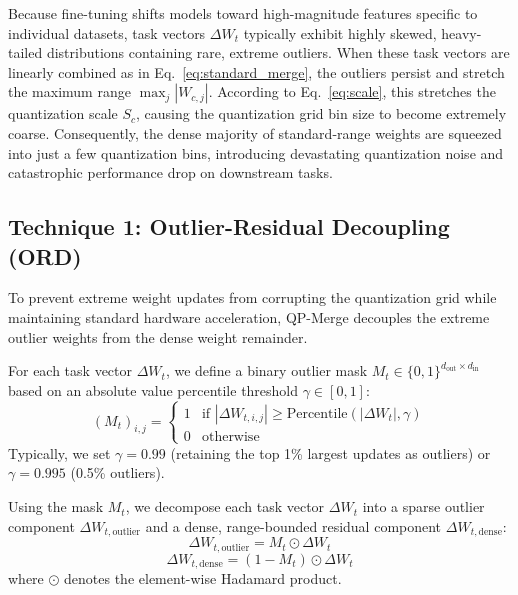 Because fine-tuning shifts models toward high-magnitude features specific to individual datasets, task vectors $\Delta W_t$ typically exhibit highly skewed, heavy-tailed distributions containing rare, extreme outliers. When these task vectors are linearly combined as in Eq.~\ref{eq:standard_merge}, the outliers persist and stretch the maximum range $\max_j |W_{c,j}|$. According to Eq.~\ref{eq:scale}, this stretches the quantization scale $S_c$, causing the quantization grid bin size to become extremely coarse. Consequently, the dense majority of standard-range weights are squeezed into just a few quantization bins, introducing devastating quantization noise and catastrophic performance drop on downstream tasks.

\subsection{Technique 1: Outlier-Residual Decoupling (ORD)}
To prevent extreme weight updates from corrupting the quantization grid while maintaining standard hardware acceleration, QP-Merge decouples the extreme outlier weights from the dense weight remainder. 

For each task vector $\Delta W_t$, we define a binary outlier mask $M_t \in \{0, 1\}^{d_{\text{out}} \times d_{\text{in}}}$ based on an absolute value percentile threshold $\gamma \in [0, 1]$:
\begin{equation}
(M_t)_{i,j} = \begin{cases} 1 & \text{if } |\Delta W_{t, i, j}| \ge \text{Percentile}(|\Delta W_t|, \gamma) \\ 0 & \text{otherwise} \end{cases}
\end{equation}
Typically, we set $\gamma = 0.99$ (retaining the top 1\% largest updates as outliers) or $\gamma = 0.995$ (0.5\% outliers). 

Using the mask $M_t$, we decompose each task vector $\Delta W_t$ into a sparse outlier component $\Delta W_{t, \text{outlier}}$ and a dense, range-bounded residual component $\Delta W_{t, \text{dense}}$:
\begin{equation}
\Delta W_{t, \text{outlier}} = M_t \odot \Delta W_t
\end{equation}
\begin{equation}
\Delta W_{t, \text{dense}} = (1 - M_t) \odot \Delta W_t
\end{equation}
where $\odot$ denotes the element-wise Hadamard product.

